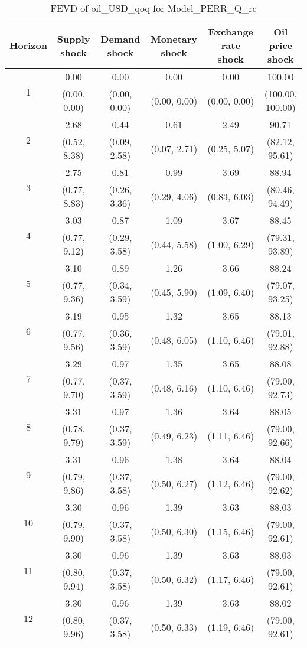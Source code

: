 \documentclass{article}
\begin{document}
\begin{table}
	\footnotesize
	\caption{FEVD of oil_USD_qoq for Model_PERR_Q_rc}
	\begin{tabular}{cccccc}
		Horizon & Supply shock & Demand shock & Monetary shock & Exchange rate shock & Oil price shock\\ \hline
		\multirow{2}{*}{1} & 0.00 & 0.00 & 0.00 & 0.00 & 100.00\\
		 & (0.00, 0.00) & (0.00, 0.00) & (0.00, 0.00) & (0.00, 0.00) & (100.00, 100.00)\\
		\multirow{2}{*}{2} & 2.68 & 0.44 & 0.61 & 2.49 & 90.71\\
		 & (0.52, 8.38) & (0.09, 2.58) & (0.07, 2.71) & (0.25, 5.07) & (82.12, 95.61)\\
		\multirow{2}{*}{3} & 2.75 & 0.81 & 0.99 & 3.69 & 88.94\\
		 & (0.77, 8.83) & (0.26, 3.36) & (0.29, 4.06) & (0.83, 6.03) & (80.46, 94.49)\\
		\multirow{2}{*}{4} & 3.03 & 0.87 & 1.09 & 3.67 & 88.45\\
		 & (0.77, 9.12) & (0.29, 3.58) & (0.44, 5.58) & (1.00, 6.29) & (79.31, 93.89)\\
		\multirow{2}{*}{5} & 3.10 & 0.89 & 1.26 & 3.66 & 88.24\\
		 & (0.77, 9.36) & (0.34, 3.59) & (0.45, 5.90) & (1.09, 6.40) & (79.07, 93.25)\\
		\multirow{2}{*}{6} & 3.19 & 0.95 & 1.32 & 3.65 & 88.13\\
		 & (0.77, 9.56) & (0.36, 3.59) & (0.48, 6.05) & (1.10, 6.46) & (79.01, 92.88)\\
		\multirow{2}{*}{7} & 3.29 & 0.97 & 1.35 & 3.65 & 88.08\\
		 & (0.77, 9.70) & (0.37, 3.59) & (0.48, 6.16) & (1.10, 6.46) & (79.00, 92.73)\\
		\multirow{2}{*}{8} & 3.31 & 0.97 & 1.36 & 3.64 & 88.05\\
		 & (0.78, 9.79) & (0.37, 3.59) & (0.49, 6.23) & (1.11, 6.46) & (79.00, 92.66)\\
		\multirow{2}{*}{9} & 3.31 & 0.96 & 1.38 & 3.64 & 88.04\\
		 & (0.79, 9.86) & (0.37, 3.58) & (0.50, 6.27) & (1.12, 6.46) & (79.00, 92.62)\\
		\multirow{2}{*}{10} & 3.30 & 0.96 & 1.39 & 3.63 & 88.03\\
		 & (0.79, 9.90) & (0.37, 3.58) & (0.50, 6.30) & (1.15, 6.46) & (79.00, 92.61)\\
		\multirow{2}{*}{11} & 3.30 & 0.96 & 1.39 & 3.63 & 88.03\\
		 & (0.80, 9.94) & (0.37, 3.58) & (0.50, 6.32) & (1.17, 6.46) & (79.00, 92.61)\\
		\multirow{2}{*}{12} & 3.30 & 0.96 & 1.39 & 3.63 & 88.02\\
		 & (0.80, 9.96) & (0.37, 3.58) & (0.50, 6.33) & (1.19, 6.46) & (79.00, 92.61)\\
	\end{tabular}
\label{tab:fevd-Model_PERR_Q_rc-oil_USD_qoq}
\end{table}
\end{document}
